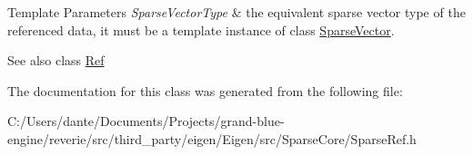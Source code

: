 \begin{DoxyTemplParams}{Template Parameters}
{\em Sparse\+Vector\+Type} & the equivalent sparse vector type of the referenced data, it must be a template instance of class \mbox{\hyperlink{class_eigen_1_1_sparse_vector}{Sparse\+Vector}}.\\
\hline
\end{DoxyTemplParams}
\begin{DoxySeeAlso}{See also}
class \mbox{\hyperlink{class_eigen_1_1_ref}{Ref}} 
\end{DoxySeeAlso}


The documentation for this class was generated from the following file\+:\begin{DoxyCompactItemize}
\item 
C\+:/\+Users/dante/\+Documents/\+Projects/grand-\/blue-\/engine/reverie/src/third\+\_\+party/eigen/\+Eigen/src/\+Sparse\+Core/Sparse\+Ref.\+h\end{DoxyCompactItemize}
